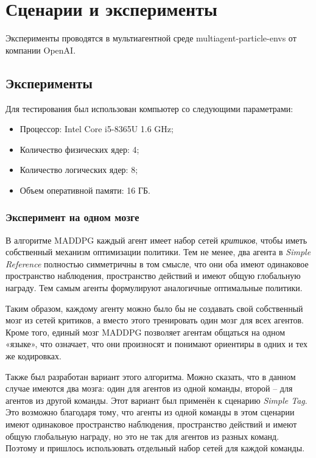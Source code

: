 \chapter{Сценарии и эксперименты}

Эксперименты проводятся в мультиагентной среде multiagent-particle-envs \cite{multiagent-particle-envs} от компании OpenAI.


\section{Эксперименты}

Для тестирования был использован компьютер со следующими параметрами:

\begin{itemize}
	\item Процессор: Intel Core i5-8365U 1.6 GHz;
	\item Количество физических ядер: 4;
	\item Количество логических ядер: 8;
	\item Объем оперативной памяти: 16 ГБ.
\end{itemize}

\subsection{Эксперимент на одном мозге}

В алгоритме MADDPG каждый агент имеет набор сетей \textit{критиков}, чтобы иметь собственный механизм оптимизации политики. Тем не менее, два агента в \textit{Simple Reference} полностью симметричны в том смысле, что они оба имеют одинаковое пространство наблюдения, пространство действий и имеют общую глобальную награду. Тем самым агенты формулируют аналогичные оптимальные политики.

Таким образом, каждому агенту можно было бы не создавать свой собственный мозг из сетей критиков, а вместо этого тренировать один мозг для всех агентов. Кроме того, единый мозг MADDPG позволяет агентам общаться на одном «языке», что означает, что они произносят и понимают ориентиры в одних и тех же кодировках.

Также был разработан вариант этого алгоритма. Можно сказать, что в данном случае имеются два мозга: один для агентов из одной команды, второй – для агентов из другой команды. Этот вариант был применён к сценарию \textit{Simple Tag}. Это возможно благодаря тому, что агенты из одной команды в этом сценарии имеют одинаковое пространство наблюдения, пространство действий и имеют общую глобальную награду, но это не так для агентов из разных команд. Поэтому и пришлось использовать отдельный набор сетей для каждой команды.

